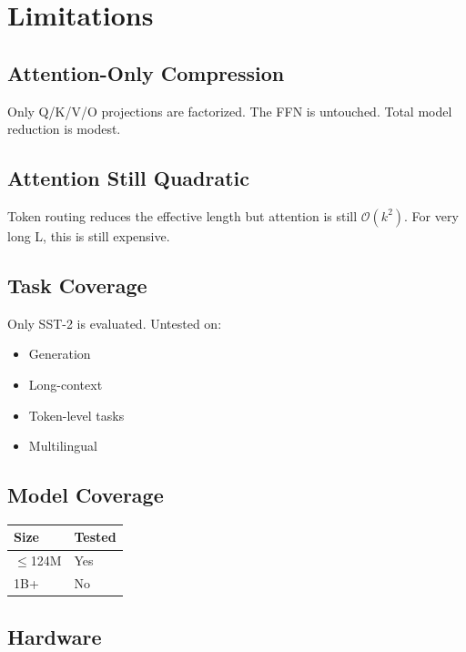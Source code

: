 \section{Limitations}

\subsection{Attention-Only Compression}

Only Q/K/V/O projections are factorized. The FFN is untouched. Total 
model reduction is modest.

\subsection{Attention Still Quadratic}

Token routing reduces the effective length but attention is still 
$\mathcal{O}(k^2)$. For very long L, this is still expensive.

\subsection{Task Coverage}

Only SST-2 is evaluated. Untested on:
\begin{itemize}
\item Generation
\item Long-context
\item Token-level tasks
\item Multilingual

\end{itemize}
\subsection{Model Coverage}

\begin{table}[H]
\centering
\small
\begin{tabular}{ll}
\toprule
\textbf{Size} & \textbf{Tested} \\
\midrule
$\le$124M & Yes \\
1B+ & No \\
\bottomrule
\end{tabular}
\end{table}

\subsection{Hardware}

